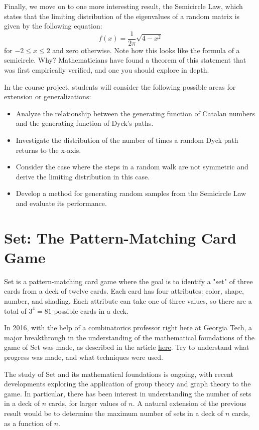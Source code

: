 \documentclass{article}
\begin{document}
    \vspace{3mm}
    Finally, we move on to one more interesting result, the Semicircle Law, which states that the limiting distribution of the eigenvalues of a random matrix is given by the following equation:
    $$f(x) = \frac{1}{2\pi}\sqrt{4 - x^{2}}$$
    for $-2 \le x \le 2$ and zero otherwise. Note how this looks like the formula of a semicircle. Why? Mathematicians have found a theorem of this statement that was first empirically verified, and one you should explore in depth.
    
    \vspace{3mm}
    \noindent In the course project, students will consider the following possible areas for extension or generalizations:
    \begin{itemize}
        \item Analyze the relationship between the generating function of Catalan numbers and the generating function of Dyck's paths.
        \item Investigate the distribution of the number of times a random Dyck path returns to the x-axis.
        \item Consider the case where the steps in a random walk are not symmetric and derive the limiting distribution in this case.
        \item Develop a method for generating random samples from the Semicircle Law and evaluate its performance.
    \end{itemize}

\pagebreak
\section{Set: The Pattern-Matching Card Game}
Set is a pattern-matching card game where the goal is to identify a "set" of three cards from a deck of twelve cards. Each card has four attributes: color, shape, number, and shading. Each attribute can take one of three values, so there are a total of $3^4=81$ possible cards in a deck.

    \vspace{3mm}
    In 2016, with the help of a combinatorics professor right here at Georgia Tech, a major breakthrough in the understanding of the mathematical foundations of the game of Set was made, as described in the article \href{https://www.quantamagazine.org/set-proof-stuns-mathematicians-20160531/}{here}. Try to understand what progress was made, and what techniques were used.
    
    \vspace{3mm}
    The study of Set and its mathematical foundations is ongoing, with recent developments exploring the application of group theory and graph theory to the game. In particular, there has been interest in understanding the number of sets in a deck of $n$ cards, for larger values of $n$. A natural extension of the previous result would be to determine the maximum number of sets in a deck of $n$ cards, as a function of $n$.
    
\end{document}
